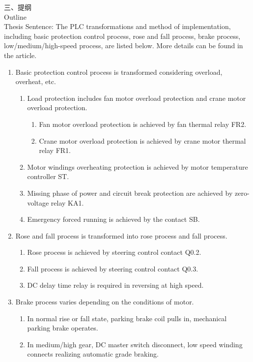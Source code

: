 \documentclass[a4paper]{article}
\renewcommand{\Large}{\fontsize{12pt}{\baselineskip}\selectfont}
\begin{document}
{ \Large 三、提纲} \\
{ \Large Outline} \\
Thesis Sentence: The PLC transformations and method of implementation, including basic protection control process, rose and fall process, brake process, low/medium/high-speed process, are listed below. More details can be found in the article.
\begin{enumerate}
\item Basic protection control process is transformed considering overload, overheat, etc.
	\begin{enumerate}
\item Load protection includes fan motor overload protection and crane motor overload protection.
		\begin{enumerate}
\item Fan motor overload protection is achieved  by fan thermal relay FR2.
\item Crane motor overload protection is achieved  by crane motor thermal relay FR1.
		\end{enumerate}
\item Motor windings overheating protection is achieved by  motor temperature controller ST.
\item Missing phase of power and circuit break protection are achieved by  zero-voltage relay KA1.
\item Emergency forced running is achieved by the contact SB.
	\end{enumerate}
\item Rose and fall process is transformed into rose process and fall process.
	\begin{enumerate}
\item Rose process  is achieved by steering control contact Q0.2.
\item Fall process is  achieved by steering control contact Q0.3.
\item DC delay time relay is required in reversing at high speed.
	\end{enumerate}
\item Brake process varies depending on the conditions of motor.
	\begin{enumerate} 
\item In normal rise or fall state, parking brake   coil pulls in, mechanical parking brake operates.
\item In medium/high gear, DC master switch disconnect, low speed winding connects realizing automatic grade braking.

\end{enumerate}
\end{enumerate}
\end{document}
